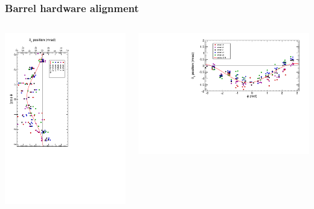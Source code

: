 \documentclass[compress]{beamer}
\begin{document}
\begin{frame}
\frametitle{Barrel hardware alignment}

\begin{columns}
\includegraphics[height=\linewidth, angle=90]{NOV4DT_vs_HARDWARE_phi.pdf}

\includegraphics[width=\linewidth]{NovHardware_vs_phi.pdf}


\end{columns}
\end{frame}
\end{document}
